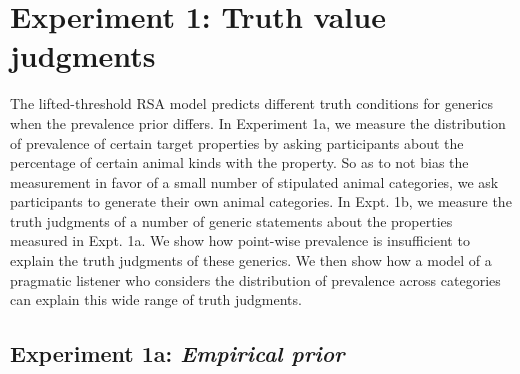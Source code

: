 \documentclass[10pt,letterpaper]{article}
\begin{document}
%

\section{Experiment 1: Truth value judgments}

The lifted-threshold RSA model predicts different truth conditions for generics when the prevalence prior differs. In Experiment 1a, we measure the distribution of prevalence of certain target properties by asking participants about the percentage of certain animal kinds with the property. So as to not bias the measurement in favor of a small number of stipulated animal categories, we ask participants to generate their own animal categories. In Expt. 1b, we measure the truth judgments of a number of generic statements about the properties measured in Expt. 1a. We show how point-wise prevalence is insufficient to explain the truth judgments of these generics. We then show how a model of a pragmatic listener who considers the distribution of prevalence across categories can explain this wide range of truth judgments.


\subsection{Experiment 1a: \emph{Empirical prior}}
\end{document}
